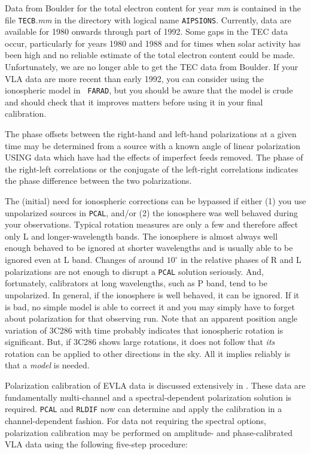     Data from Boulder for the total electron content for year {\it
mm\/} is contained in the file {\tt TECB}{\it .mm\/} in the directory
with logical name \hbox{{\tt AIPSIONS}}.  Currently, data are
available for 1980 onwards through part of 1992.  Some gaps in the TEC
data occur, particularly for years 1980 and 1988 and for times when
solar activity has been high and no reliable estimate of the total
electron content could be made.  Unfortunately, we are no longer able
to get the TEC data from Boulder.  If your VLA data are more recent
than early 1992, you can consider using the ionospheric model in {\tt
FARAD}, but you should be aware that the model is crude and should
check that it improves matters before using it in your final
calibration.

     The phase offsets between the right-hand and left-hand
polarizations at a given time may be determined from a source with a
known angle of linear polarization USING data which have had the
effects of imperfect feeds removed.  The phase of the right-left
correlations or the conjugate of the left-right correlations indicates
the phase difference between the two polarizations.

     The (initial) need for ionospheric corrections can be bypassed if
either (1) you use unpolarized sources in {\tt PCAL}, and/or (2) the
ionosphere was well behaved during your observations.  Typical
rotation measures are only a few and therefore affect only L and
longer-wavelength bands.  The ionosphere is almost always well enough
behaved to be ignored at shorter wavelengths and is usually able to be
ignored even at L band.  Changes of around $10^{\circ}$ in the
relative phases of R and L polarizations are not enough to disrupt a
{\tt PCAL} solution seriously.  And, fortunately, calibrators at long
wavelengths, such as P band, tend to be unpolarized.  In general, if
the ionosphere is well behaved, it can be ignored.  If it is bad, no
simple model is able to correct it and you may simply have to forget
about polarization for that observing run.  Note that an apparent
position angle variation of 3C286 with time probably indicates that
ionospheric rotation is significant.  But, if 3C286 shows large
rotations, it does not follow that {\it its\/} rotation can be applied
to other directions in the sky.  All it implies reliably is that a
{\it model\/} is needed.

     Polarization calibration of EVLA data is discussed extensively in
.  These data are fundamentally multi-channel and a
spectral-dependent polarization solution is required.  {\tt PCAL} and
{\tt RLDIF} now can determine and apply the calibration in a
channel-dependent fashion.  For data not requiring the spectral
options, polarization calibration may be performed on amplitude- and
phase-calibrated VLA data using the following five-step procedure:

